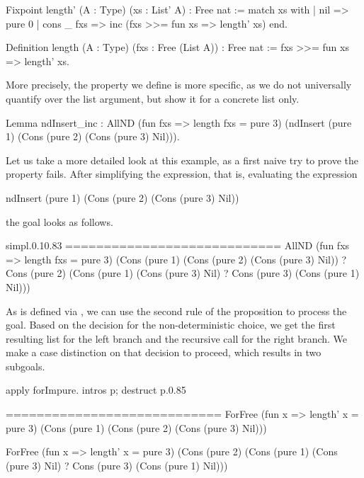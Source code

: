 \begin{coqcode}
Fixpoint length' (A : Type) (xs : List' A) : Free nat :=
  match xs with
  | nil        => pure 0
  | cons _ fxs => inc (fxs >>= fun xs => length' xs)
  end.

Definition length (A : Type) (fxs : Free (List A)) : Free nat :=
  fxs >>= fun xs => length' xs.
\end{coqcode}
  
More precisely, the property we define is more specific, as we do not universally quantify over the list argument, but show it for a concrete list only.

\begin{coqcode}
Lemma ndInsert_inc :
  AllND (fun fxs => length fxs = pure 3)
        (ndInsert (pure 1) (Cons (pure 2) (Cons (pure 3) Nil))).
\end{coqcode}

Let us take a more detailed look at this example, as a first naive try to prove the property fails.
After simplifying the expression, that is, evaluating the expression
\begin{coqcode}
  ndInsert (pure 1) (Cons (pure 2) (Cons (pure 3) Nil))
\end{coqcode}
the goal looks as follows.

\begin{cproof1}{simpl.}{0.1}{0.83}
  ============================
  AllND (fun fxs => length fxs = pure 3)
        (Cons (pure 1) (Cons (pure 2) (Cons (pure 3) Nil))
        ? Cons (pure 2) (Cons (pure 1) (Cons (pure 3) Nil)
                        ? Cons (pure 3) (Cons (pure 1) Nil)))
\end{cproof1}

As  is defined via , we can use the second rule of the proposition to process the goal.
Based on the decision for the non\--deterministic choice, we get the first resulting list for the left branch and the recursive call for the right branch.
We make a case distinction on that decision to proceed, which results in two subgoals.

\begin{cproof2}{apply forImpure. intros p; destruct p.}{0.85}

  ============================
  ForFree (fun x => length' x = pure 3)
          (Cons (pure 1) (Cons (pure 2) (Cons (pure 3) Nil)))

  ForFree (fun x => length' x = pure 3)
          (Cons (pure 2) (Cons (pure 1) (Cons (pure 3) Nil)
                         ? Cons (pure 3) (Cons (pure 1) Nil)))
\end{cproof2}

